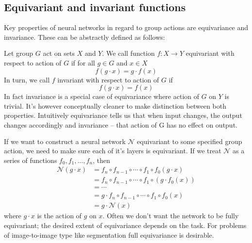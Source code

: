\subsection{Equivariant and invariant functions}
    \label{sec:theoretical_equiinv}
    \hspace{0.5cm}
     Key properties of neural networks in regard to group actions are equivariance and invariance.
        These can be abstractly defined as follows: \par
        Let group $G$ act on sets $X$ and $Y$. We call function $f: X \rightarrow Y$ equivariant
        with respect to action of $G$ if for all $g \in G$ and $x \in X$
        \begin{equation}
            f(g \cdot x) = g \cdot f(x)
        \end{equation}
        In turn, we call $f$ invariant with respect to action of $G$ if
        \begin{equation}
            f(g \cdot x) = f(x)
        \end{equation}
        In fact invariance is a special case of equivariance where action of $G$ on $Y$ is trivial.
        It's however conceptually cleaner to make distinction between both properties.
        Intuitively equivariance tells us that when input changes, the output changes accordingly
        and invariance -- that action of G has no effect on output.\par
            If we want to construct a neural network $\mathcal{N}$ equivariant to some
        specified group action, we need to make sure each of it's layers is equivariant.
        If we treat $\mathcal{N}$ as a series of functions $f_0,f_1,...,f_n$, then
        \begin{align*}
            \mathcal{N}(g \cdot x) &=
            f_n \circ f_{n-1} \circ \cdots \circ f_1 \circ f_0(g\cdot x)  \\
            &= f_n \circ f_{n-1} \circ \cdots \circ f_1 \circ \left( g \cdot f_0(x) \right) \\
            &= \cdots \\
            &= g \cdot f_n \circ f_{n-1} \circ \cdots \circ f_1 \circ f_0(x) \\
            &= g \cdot \mathcal{N}(x)
        \end{align*}
        where $g\cdot x$ is the action of $g$ on $x$. Often we don't want the network
        to be fully equivariant; the desired extent of equivariance depends on the task.
        For problems of image-to-image type like segmentation full equivariance is desirable.
